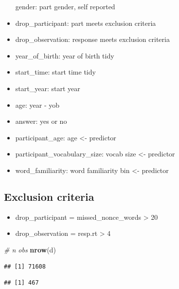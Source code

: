 \documentclass[
]{article}
\newenvironment{Shaded}{\begin{snugshade}}{\end{snugshade}}
\newcommand{\CommentTok}[1]{\textcolor[rgb]{0.56,0.35,0.01}{\textit{#1}}}
\newcommand{\FunctionTok}[1]{\textcolor[rgb]{0.13,0.29,0.53}{\textbf{#1}}}
\newcommand{\NormalTok}[1]{#1}
\newcommand{\SpecialCharTok}[1]{\textcolor[rgb]{0.81,0.36,0.00}{\textbf{#1}}}
\providecommand{\tightlist}{%
  \setlength{\itemsep}{0pt}\setlength{\parskip}{0pt}}
\begin{document}
\begin{itemize}
  gender: part gender, self reported
\item
  drop\_participant: part meets exclusion criteria
\item
  drop\_observation: response meets exclusion criteria
\item
  year\_of\_birth: year of birth tidy
\item
  start\_time: start time tidy
\item
  start\_year: start year
\item
  age: year - yob
\item
  answer: yes or no
\item
  participant\_age: age \textless- predictor
\item
  participant\_vocabulary\_size: vocab size \textless- predictor
\item
  word\_familiarity: word familiarity bin \textless- predictor
\end{itemize}

\subsection{Exclusion criteria}\label{exclusion-criteria}

\begin{itemize}
\tightlist
\item
  drop\_participant = missed\_nonce\_words \textgreater{} 20
\item
  drop\_observation = resp.rt \textgreater{} 4
\end{itemize}

\begin{Shaded}
\begin{Highlighting}[]
\CommentTok{\# n obs}
\FunctionTok{nrow}\NormalTok{(d)}
\end{Highlighting}
\end{Shaded}

\begin{verbatim}
## [1] 71608
\end{verbatim}

\begin{Shaded}
\end{Shaded}

\begin{verbatim}
## [1] 467
\end{verbatim}
\end{document}
